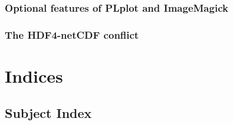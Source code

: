\documentclass[10pt,titleauthor,openany]{mwbk}
\begin{document}
  \section{Optional features of PLplot and ImageMagick}
  \section{The HDF4-netCDF conflict}

  \part{Indices}
  \onecolumn
  \appendix
  \secondarysize
  \chapter*{Subject Index}
  \begin{multicols}{3}{\printindex}
  \end{multicols}

  \twocolumn
  
\end{document}
